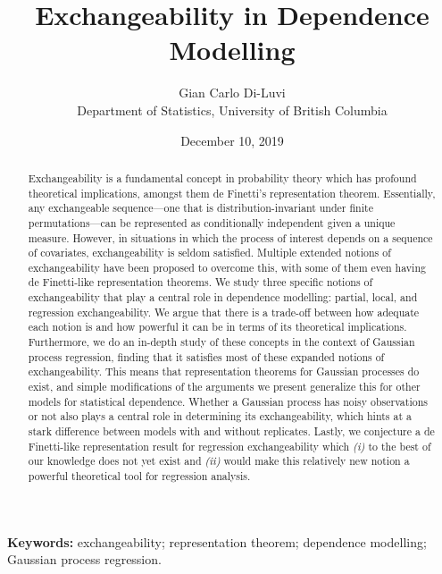 \documentclass[10pt]{article}
\title{Exchangeability in Dependence Modelling} %
\author{Gian Carlo Di-Luvi 
\\
{\normalsize Department of Statistics, University of British Columbia}} %
\date{\normalsize December 10, 2019} %
\begin{document}
\maketitle
\thispagestyle{empty}

\vskip 0.75cm

\begin{abstract}
\noindent Exchangeability is a fundamental concept in probability theory which has profound theoretical implications, amongst them de Finetti's representation theorem. Essentially, any exchangeable sequence---one that is distribution-invariant under finite permutations---can be represented as conditionally independent given a unique measure. However, in situations in which the process of interest depends on a sequence of covariates, exchangeability is seldom satisfied. Multiple extended notions of exchangeability have been proposed to overcome this, with some of them even having de Finetti-like representation theorems. We study three specific notions of exchangeability that play a central role in dependence modelling: partial, local, and regression exchangeability. We argue that there is a trade-off between how adequate each notion is and how powerful it can be in terms of its theoretical implications. Furthermore, we do an in-depth study of these concepts in the context of Gaussian process regression, finding that it satisfies most of these expanded notions of exchangeability. This means that representation theorems for Gaussian processes do exist, and simple modifications of the arguments we present generalize this for other models for statistical dependence. Whether a Gaussian process has noisy observations or not also plays a central role in determining its exchangeability, which hints at a stark difference between models with and without replicates. Lastly, we conjecture a de Finetti-like representation result for regression exchangeability which \textit{(i)} to the best of our knowledge does not yet exist and \textit{(ii)} would make this relatively new notion a powerful theoretical tool for regression analysis.
\end{abstract}

\textbf{Keywords:} exchangeability; representation theorem; dependence modelling; Gaussian process regression.




\cleardoublepage
\setcounter{page}{1}


\vskip 2cm

\end{document}
